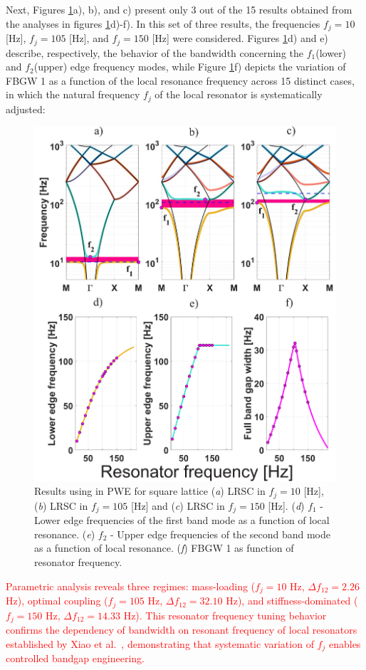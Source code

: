 \documentclass[review,numbers,sort&compress]{elsarticle}
\begin{document}
Next, Figures \ref{pwe_disp_square_all_res}a), b), and c) present only 3 out of the 15 results obtained from the analyses in figures \ref{pwe_disp_square_all_res}d)-f). In this set of three results, the frequencies $f_j = 10$ [Hz], $f_j = 105$ [Hz], and $f_j = 150$ [Hz] were considered. Figures \ref{pwe_disp_square_all_res}d) and e) describe, respectively, the behavior of the bandwidth concerning the $f_1$(lower) and $f_2$(upper) edge frequency modes, while Figure \ref{pwe_disp_square_all_res}f) depicts the variation of FBGW 1 as a function of the local resonance frequency across 15 distinct cases, in which the natural frequency $f_j$ of the local resonator is systematically adjusted:
\newpage
\begin{figure}[htb]
	\centering
	\includegraphics[width=.8\textwidth]{2_1_disp_frf_square.pdf}
	\caption{Results using in PWE for square lattice (\textit{a}) LRSC in $f_j=10$ [Hz], (\textit{b}) LRSC in $f_j=105$ [Hz] and (\textit{c}) LRSC in $f_j=150$ [Hz]. (\textit{d}) $f_1$ - Lower edge frequencies of the first band mode as a function of local resonance. (\textit{e}) $f_2$ - Upper edge frequencies of the second band mode as a function of local resonance. (\textit{f}) FBGW 1 as function of resonator frequency.}
	\label{pwe_disp_square_all_res}
\end{figure}

\textcolor{red}{Parametric analysis reveals three regimes: mass-loading ($f_j = 10$ Hz, $\Delta f_{12} = 2.26$ Hz), optimal coupling ($f_j = 105$ Hz, $\Delta f_{12} = 32.10$ Hz), and stiffness-dominated ($f_j = 150$ Hz, $\Delta f_{12} = 14.33$ Hz). This resonator frequency tuning behavior confirms the dependency of bandwidth on resonant frequency of local resonators established by Xiao et al.~\cite{Xiao_2012}, demonstrating that systematic variation of $f_j$ enables controlled bandgap engineering.}
\end{document}
